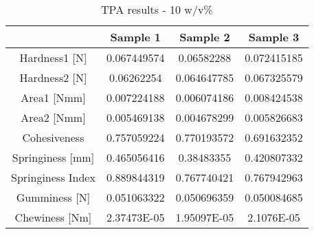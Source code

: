 \begin{table}[H]
    \centering
    \begin{tabular}{c|ccc}
    \hline
    & Sample 1 & Sample 2 & Sample 3 \\ \hline
    Hardness1 [N] & 0.067449574 & 0.06582288 & 0.072415185 \\ 
    Hardness2 [N] & 0.06262254 & 0.064647785 & 0.067325579 \\ 
    Area1 [Nmm] & 0.007224188 & 0.006074186 & 0.008424538 \\ 
    Area2 [Nmm] & 0.005469138 & 0.004678299 & 0.005826683 \\ 
    Cohesiveness & 0.757059224 & 0.770193572 & 0.691632352 \\ 
    Springiness [mm] & 0.465056416 & 0.38483355 & 0.420807332 \\ 
    Springiness Index & 0.889844319 & 0.767740421 & 0.767942963 \\ 
    Gumminess [N] & 0.051063322 & 0.050696359 & 0.050084685 \\ 
    Chewiness [Nm] & 2.37473E-05 & 1.95097E-05 & 2.1076E-05 \\
    \end{tabular}
    \caption{TPA results - 10 w/v\%}
    \label{tab:inverted-mechanical-test-results-10wv}
    \end{table}